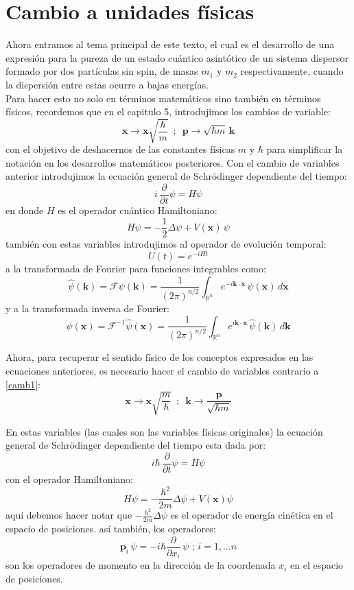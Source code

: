 \documentclass[12pt]{book}
\numberwithin{equation}{chapter}
\def\R{\mathbb{R}}
\def\rar{\rightarrow}
\def\F{\mathcal{F}}
\def\x{\mathbf{x}}
\def\k{\mathbf{k}}
\def\P{\mathbf{p}}
\begin{document}
\section{Cambio a unidades f\'isicas}
Ahora entramos al tema principal de este texto, el cual es el desarrollo de una expresi\'on para la pureza de un estado cu\'antico asint\'otico de un sistema dispersor formado por dos part\'iculas sin spin, de masas $m_{1}$ y $m_{2}$ respectivamente, cuando la dispersi\'on entre estas ocurre a bajas energ\'ias.\\
Para hacer esto no solo en t\'erminos matem\'aticos sino tambi\'en en t\'erminos f\'isicos, recordemos que en el capitulo 5, introdujimos los cambios de variable:
\begin{equation}\label{camb1}
\x \rar \x \sqrt{\frac{\hbar}{m}} \,\,\, ; \,\,\, \P \rar \sqrt{\hbar m}\, \k
\end{equation}
con el objetivo de deshacernos de las constantes f\'isicas $m$ y $\hbar$ para simplificar la notaci\'on en los desarrollos matem\'aticos posteriores. Con el cambio de variables anterior introdujimos la ecuaci\'on general de Schr\"odinger dependiente del tiempo:
$$ i \, \frac{\partial}{\partial t}\psi = H\psi $$
en donde $H$ es el operador cu\'antico Hamiltoniano:
$$ H \psi=- \frac{1}{2} \Delta \psi + V(\x) \, \psi $$
tambi\'en con estas variables introdujimos al operador de evoluci\'on temporal:
$$ U(t) = e^{-iHt} $$
a la transformada de Fourier para funciones integrables como:
$$ \hat{\psi}(\k) = \F\psi(\k)=\frac{1}{(2\pi)^{n/2}} \int_{\R^{n}} e^{-i \k \cdot \x} \, \psi(\x)\, d\x $$
y a la transformada inversa de Fourier:
$$ \psi(\x) =  \F^{-1}\hat{\psi}(\x) =\frac{1}{(2\pi)^{n/2}} \int_{\R^{n}} e^{i \k \cdot \x} \, \hat{\psi}(\k)\, d\k $$

Ahora, para recuperar el sentido f\'isico de los conceptos expresados en las ecuaciones anteriores, es necesario hacer el cambio de variables contrario a \eqref{camb1}:
$$ \x \rar \x \sqrt{\frac{m}{\hbar}} \,\,\, ; \,\,\, \k \rar \frac{\P}{\sqrt{\hbar m}} $$

En estas variables (las cuales son las variables f\'isicas originales) la ecuaci\'on general de Schr\"odinger dependiente del tiempo esta dada por:
$$ i\hbar \, \frac{\partial}{\partial t} \psi = H \psi  $$
con el operador Hamiltoniano:
$$ H \psi = -\frac{\hbar^{2}}{2m} \Delta \psi + V(\x) \psi $$
aqu\'i debemos hacer notar que $-\frac{\hbar^{2}}{2m} \Delta \psi$ es el operador de energ\'ia cin\'etica en el espacio de posiciones. as\'i tambi\'en, los operadores:
\begin{equation}\label{mom-op}
\P_{i}\, \psi=  -i\hbar \frac{\partial }{\partial x_{i}} \, \psi \,\,;\, i=1,\ldots n
\end{equation}
son los operadores de momento en la direcci\'on de la coordenada $x_{i}$ en el espacio de posiciones.\\
\end{document}
